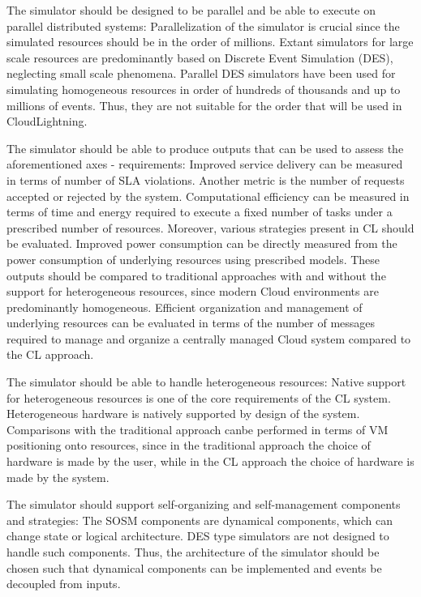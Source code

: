 The simulator should be designed to be parallel and be able to execute on parallel distributed systems: Parallelization of the simulator is crucial since the simulated resources should be in the order of millions. Extant simulators for large scale resources are predominantly based on Discrete Event Simulation (DES), neglecting small scale phenomena. Parallel DES simulators have been used for simulating homogeneous resources in order of hundreds of thousands and up to millions of events. Thus, they are not suitable for the order that will be used in CloudLightning.

The simulator should be able to produce outputs that can be used to assess the aforementioned axes - requirements: Improved service delivery can be measured in terms of number of SLA violations. Another metric is the number of requests accepted or rejected by the system. Computational efficiency can be measured in terms of time and energy required to execute a fixed number of tasks under a prescribed number of resources. Moreover, various strategies present in CL should be evaluated. Improved power consumption can be directly measured from the power consumption of underlying resources using prescribed models. These outputs should be compared to traditional approaches with and without the support for heterogeneous resources, since modern Cloud environments are predominantly homogeneous. Efficient organization and management of underlying resources can be evaluated in terms of the number of messages required to manage and organize a centrally managed Cloud system compared to the CL approach.

The simulator should be able to handle heterogeneous resources: Native support for heterogeneous resources is one of the core requirements of the CL system. Heterogeneous hardware is natively supported by design of the system. Comparisons with the traditional approach canbe performed in terms of VM positioning onto resources, since in the traditional approach the choice of hardware is made by the user, while in the CL approach the choice of hardware is made by the system.

The simulator should support self-organizing and self-management components and strategies: The SOSM components are dynamical components, which can change state or logical architecture. DES type simulators are not designed to handle such components. Thus, the architecture of the simulator should be chosen such that dynamical components can be implemented and events be decoupled from inputs.

